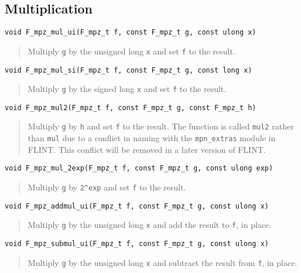 \documentclass[a4paper,10pt]{article}
\newcommand{\code}{\lstinline}
\begin{document}
\subsection{Multiplication}

\begin{lstlisting}
void F_mpz_mul_ui(F_mpz_t f, const F_mpz_t g, const ulong x)
\end{lstlisting}
\begin{quote}
Multiply \code{g} by the unsigned long \code{x} and set \code{f} to the result.
\end{quote}

\begin{lstlisting}
void F_mpz_mul_si(F_mpz_t f, const F_mpz_t g, const long x)
\end{lstlisting}
\begin{quote}
Multiply \code{g} by the signed long \code{x} and set \code{f} to the result.
\end{quote}

\begin{lstlisting}
void F_mpz_mul2(F_mpz_t f, const F_mpz_t g, const F_mpz_t h)
\end{lstlisting}
\begin{quote}
Multiply \code{g} by \code{h} and set \code{f} to the result. The function is called \code{mul2} rather than \code{mul} due to a conflict in naming with the \code{mpn_extras} module in FLINT. This conflict will be removed in a later version of FLINT.
\end{quote}

\begin{lstlisting}
void F_mpz_mul_2exp(F_mpz_t f, const F_mpz_t g, const ulong exp)
\end{lstlisting}
\begin{quote}
Multiply \code{g} by \code{2^exp} and set \code{f} to the result.
\end{quote}

\begin{lstlisting}
void F_mpz_addmul_ui(F_mpz_t f, const F_mpz_t g, const ulong x)
\end{lstlisting}
\begin{quote}
Multiply \code{g} by the unsigned long \code{x} and add the result to \code{f}, in place.
\end{quote}

\begin{lstlisting}
void F_mpz_submul_ui(F_mpz_t f, const F_mpz_t g, const ulong x)
\end{lstlisting}
\begin{quote}
Multiply \code{g} by the unsigned long \code{x} and subtract the result from \code{f}, in place.
\end{quote}
\end{document}
